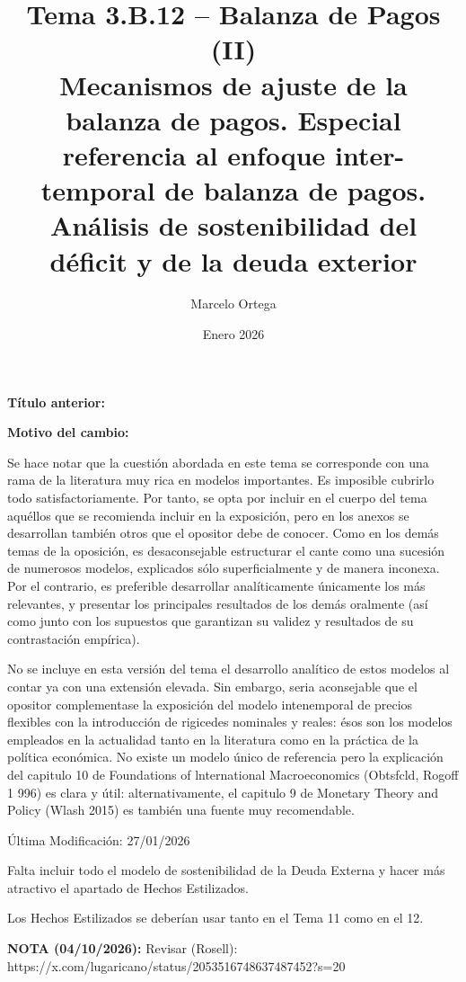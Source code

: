 \documentclass[10pt,a4paper]{article}
\title{Tema 3.B.12 -- Balanza de Pagos (II)\\
\large Mecanismos de ajuste de la balanza de pagos. Especial referencia al enfoque inter-temporal de balanza de pagos. Análisis de sostenibilidad del déficit y de la deuda exterior}
\author{Marcelo Ortega}
\date{Enero 2026}
\newcommand{\puntosclave}[1]{%
  \begin{tcolorbox}[
    colframe=black,
    title={Puntos clave},
    before upper={\setlength{\parindent}{0.5cm}\setlength{\parskip}{0.5\baselineskip}}
  ]
  #1
  \end{tcolorbox}
}
\newcommand{\modificaciones}[1]{
  \begin{tcolorbox}[
    colback=white,
    colframe=red,
    title={Modificaciones a realizar},
    before upper={\setlength{\parindent}{0.5cm}\setlength{\parskip}{0.5\baselineskip}}
  ]
  #1
  \end{tcolorbox}
}
\newcommand{\changebox}{%
\begin{tcolorbox}[title={Historial de cambios del tema}]
\textbf{Título anterior:} \OldTitle\par
\textbf{Motivo del cambio:} \ChangeWhy
\end{tcolorbox}
}
\newcounter{anexo}
\begin{document}
\maketitle
\changebox

\newpage

\puntosclave{ %
     Se hace notar que la cuestión abordada en este tema se corresponde con una rama de la literatura muy rica en modelos importantes. Es imposible cubrirlo todo satisfactoriamente. Por tanto, se opta por incluir en el cuerpo del tema aquéllos que se recomienda incluir en la exposición, pero en los anexos se desarrollan también otros que el opositor debe de conocer. Como en los demás temas de la oposición, es desaconsejable estructurar el cante como una sucesión de numerosos modelos, explicados sólo superficialmente y de manera inconexa. Por el contrario, es preferible desarrollar analíticamente únicamente los más relevantes, y presentar los principales resultados de los demás oralmente (así como junto con los supuestos que garantizan su validez y resultados de su contrastación empírica).

     No se incluye en esta versión del tema el desarrollo analítico de estos modelos al contar ya con una extensión elevada. Sin embargo, seria aconsejable que el opositor complementase la exposición del modelo intenemporal de precios flexibles con la introducción de rigicedes nominales y reales: ésos son los modelos empleados en la actualidad tanto en la literatura como en la práctica de la política económica. No existe un modelo único de referencia pero la explicación del capitulo 10 de Foundations of lnternational Macroeconomics (Obtsfcld, Rogoff 1 996) es clara y útil: alternativamente, el capitulo 9 de Monetary Theory and Policy (Wlash 2015) es también una fuente muy recomendable.

    }
\vspace{1cm}

\modificaciones{
    Última Modificación: 27/01/2026

    Falta incluir todo el modelo de sostenibilidad de la Deuda Externa y hacer más atractivo el apartado de Hechos Estilizados.

    Los Hechos Estilizados se deberían usar tanto en el Tema 11 como en el 12.

    \textbf{NOTA (04/10/2026):} Revisar (Rosell): https://x.com/lugaricano/status/2053516748637487452?s=20

}
\end{document}
